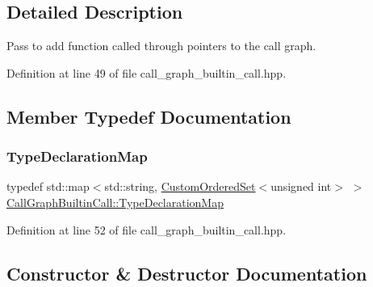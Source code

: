 \subsection{Detailed Description}
Pass to add function called through pointers to the call graph. 

Definition at line 49 of file call\+\_\+graph\+\_\+builtin\+\_\+call.\+hpp.



\subsection{Member Typedef Documentation}
\mbox{\label{classCallGraphBuiltinCall_ac5000af275152e4c862dc90cfe1453d0}} 
\subsubsection{\texorpdfstring{Type\+Declaration\+Map}{TypeDeclarationMap}}
{\footnotesize\ttfamily typedef std\+::map$<$std\+::string, \hyperlink{classCustomOrderedSet}{Custom\+Ordered\+Set}$<$unsigned int$>$ $>$ \hyperlink{classCallGraphBuiltinCall_ac5000af275152e4c862dc90cfe1453d0}{Call\+Graph\+Builtin\+Call\+::\+Type\+Declaration\+Map}\hspace{0.3cm}{\ttfamily [private]}}



Definition at line 52 of file call\+\_\+graph\+\_\+builtin\+\_\+call.\+hpp.



\subsection{Constructor \& Destructor Documentation}
\mbox{\label{classCallGraphBuiltinCall_a346a9538118b956780946e49400ba5da}} 
